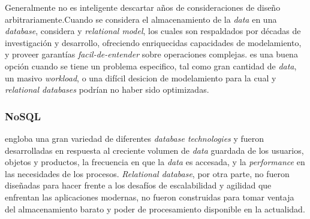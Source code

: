 Generalmente no es inteligente descartar años de consideraciones de diseño arbitrariamente.Cuando se considera el almacenamiento de la \textit{data} en una \textit{database}, considera  y \textit{relational model}, los cuales son respaldados por décadas  de investigación y desarrollo, ofreciendo enriquecidas capacidades de modelamiento, y proveer garantías \textit{facil-de-entender} sobre operaciones complejas.  es una buena opción cuando se tiene un problema especifico, tal como gran cantidad de \textit{data}, un masivo \textit{workload}, o una difícil desicion de modelamiento para la cual  y \textit{relational databases} podrían no haber sido optimizadas.

\subsubsection{NoSQL}

 engloba una gran variedad de diferentes \textit{database technologies} y fueron desarrolladas en respuesta al creciente volumen de \textit{data} guardada de los usuarios, objetos y productos, la frecuencia en que la \textit{data} es accesada, y la \textit{performance} en las necesidades de los procesos. \textit{Relational database}, por otra parte, no fueron diseñadas para hacer frente a los desafíos de escalabilidad y agilidad que enfrentan las aplicaciones modernas, no fueron construidas para tomar ventaja del almacenamiento barato y poder de procesamiento disponible en la actualidad.

